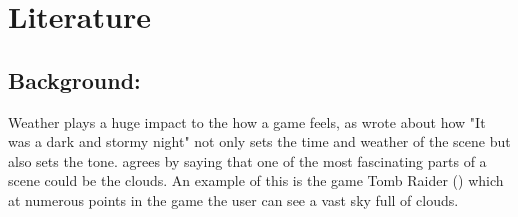\section{Literature}
\subsection{Background:}
Weather plays a huge impact to the how a game feels, as \citet{Barton08} wrote about how "It was a dark and stormy night" not only sets the time and weather of the scene but also sets the tone. \citet{NWang04} agrees by saying that one of the most fascinating parts of a scene could be the clouds. An example of this is the game Tomb Raider (\citeyear{TombRaider13}) which at numerous points in the game the user can see a vast sky full of clouds. 



